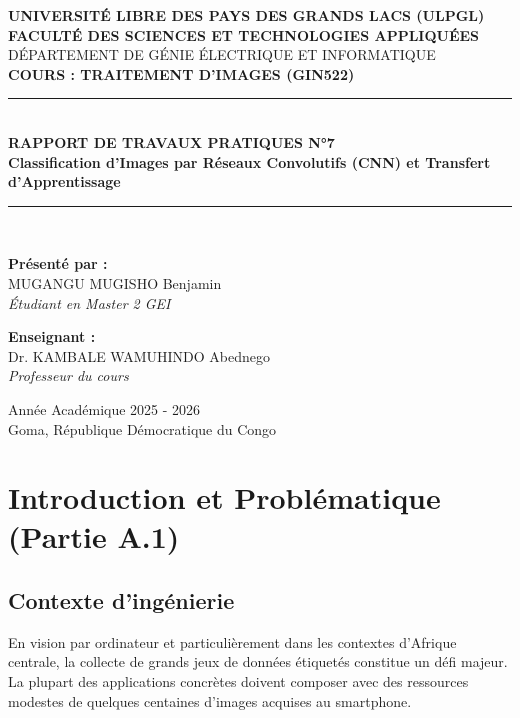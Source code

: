 \documentclass[11pt,a4paper]{article}
\begin{document}
\begin{titlepage}
    \centering
    \vspace*{1cm}
    {\large \textbf{UNIVERSITÉ LIBRE DES PAYS DES GRANDS LACS (ULPGL)}}\\[0.3cm]
    {\large \textbf{FACULTÉ DES SCIENCES ET TECHNOLOGIES APPLIQUÉES}}\\[0.2cm]
    {\normalsize DÉPARTEMENT DE GÉNIE ÉLECTRIQUE ET INFORMATIQUE}\\[2cm]

    {\large \textbf{COURS : TRAITEMENT D'IMAGES (GIN522)}}\\[1cm]

    \rule{\linewidth}{0.5mm}\\[0.4cm]
    {\huge \textbf{RAPPORT DE TRAVAUX PRATIQUES N°7}}\\[0.3cm]
    {\Large \textbf{Classification d'Images par Réseaux Convolutifs (CNN) et Transfert d'Apprentissage}}\\[0.2cm]
    \rule{\linewidth}{0.5mm}\\[2.5cm]

    \begin{minipage}{0.45\textwidth}
        \textbf{Présenté par :}\\
        MUGANGU MUGISHO Benjamin\\
        \textit{Étudiant en Master 2 GEI}
    \end{minipage}
    \hfill
    \begin{minipage}{0.45\textwidth}
        \begin{flushright}
            \textbf{Enseignant :}\\
            Dr. KAMBALE WAMUHINDO Abednego\\
            \textit{Professeur du cours}
        \end{flushright}
    \end{minipage}

    \vfill
    {\normalsize Année Académique 2025 - 2026}\\[0.5cm]
    {\small Goma, République Démocratique du Congo}
\end{titlepage}

\newpage
\tableofcontents
\newpage

\section{Introduction et Problématique (Partie A.1)}

\subsection{Contexte d'ingénierie}
En vision par ordinateur et particulièrement dans les contextes d'Afrique centrale, la collecte de grands jeux de données étiquetés constitue un défi majeur. La plupart des applications concrètes doivent composer avec des ressources modestes de quelques centaines d'images acquises au smartphone.
\end{document}

